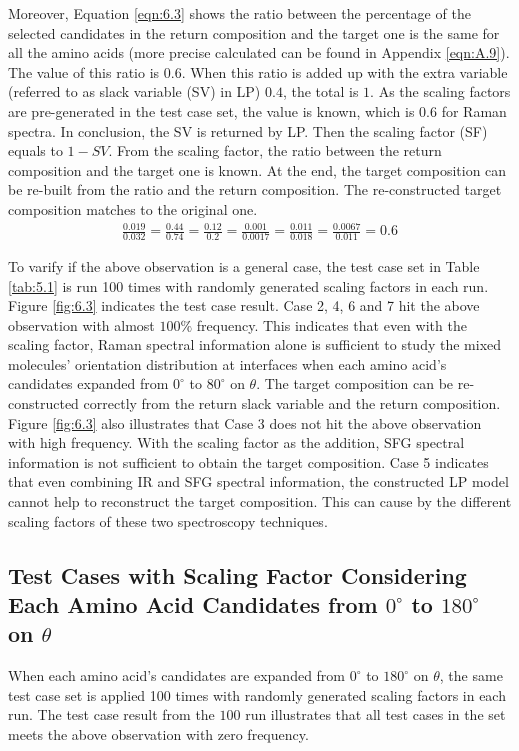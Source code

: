 Moreover, Equation \ref{eqn:6.3} shows the ratio between the percentage of the selected candidates in the return composition and the target one is the same for all the amino acids (more precise calculated can be found in Appendix \ref{eqn:A.9}). The value of this ratio is $0.6$. When this ratio is added up with the extra variable (referred to as slack variable (SV) in LP) $0.4$, the total is $1$. As the scaling factors are pre-generated in the test case set, the value is known, which is $0.6$ for Raman spectra. In conclusion, the SV is returned by LP. Then the scaling factor (SF) equals to $1 - SV$. From the scaling factor, the ratio between the return composition and the target one is known. At the end, the target composition can be re-built from the ratio and the return composition. The re-constructed target composition matches to the original one. \\

\begin{eqnarray} \label{eqn:6.3}
\frac{0.019}{0.032} = \frac{0.44}{0.74} = \frac{0.12}{0.2} =\frac{0.001}{0.0017}  = \frac{0.011}{0.018} = \frac{0.0067}{0.011} = 0.6
\end{eqnarray}

To varify if the above observation is a general case, the test case set in Table \ref{tab:5.1} is run 100 times with randomly generated scaling factors in each run. Figure \ref{fig:6.3} indicates the test case result. Case 2, 4, 6 and 7 hit the above observation with almost $100\%$ frequency. This indicates that even with the scaling factor, Raman spectral information alone is sufficient to study the mixed molecules' orientation distribution at interfaces when each amino acid's candidates expanded from $0^{\circ}$ to $80^{\circ}$ on $\theta$. The target composition can be re-constructed correctly from the return slack variable and the return composition. Figure \ref{fig:6.3} also illustrates that Case 3 does not hit the above observation with high frequency. With the scaling factor as the addition, SFG spectral information is not sufficient to obtain the target composition. Case 5 indicates that even combining IR and SFG spectral information, the constructed LP model cannot help to reconstruct the target composition. This can cause by the different scaling factors of these two spectroscopy techniques. \\

\subsection{Test Cases with Scaling Factor Considering Each Amino Acid Candidates from $0^{\circ}$ to $180^{\circ}$ on $\theta$}
When each amino acid's candidates are expanded from $0^{\circ}$ to $180^{\circ}$ on $\theta$, the same test case set is applied 100 times with randomly generated scaling factors in each run. The test case result from the $100$ run illustrates that all test cases in the set meets the above observation with zero frequency. \\

